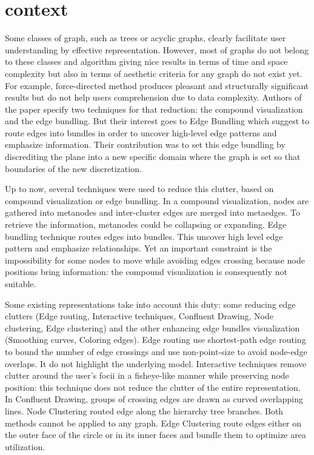 \section*{context}

Some classes of graph, such as trees or acyclic graphs, clearly facilitate user understanding by effective representation. However, most of graphs do not belong to these classes and algorithm giving nice results in terms of time and space complexity but also in terms of aesthetic criteria for any graph do not exist yet. For example, force-directed method produces pleasant and structurally significant results but do not help users comprehension due to data complexity. Authors of the paper specify two techniques for that reduction: the compound visualization and the edge bundling. But their interest goes to Edge Bundling which suggest to route edges into bundles in order to uncover high-level edge patterns and emphasize information. Their contribution was to set this edge bundling by discrediting the plane into a new specific domain where the graph is set so that boundaries of the new discretization.


Up to now, several techniques were used to reduce this clutter, based on compound visualization or edge bundling. In a compound visualization, nodes are gathered into metanodes and inter-cluster edges are merged into metaedges. To retrieve the information, metanodes could be collapsing or expanding. Edge bundling technique routes edges into bundles. This uncover high level edge pattern and emphasize relationships.
Yet an important constraint is the impossibility for some nodes to move while avoiding edges crossing because node positions bring information: the compound visualization is consequently not suitable.


Some existing representations take into account this duty: some reducing edge clutters (Edge routing, Interactive techniques, Confluent Drawing, Node clustering, Edge clustering) and the other enhancing edge bundles visualization (Smoothing curves, Coloring edges). Edge routing use shortest-path edge routing to bound the number of edge crossings and use non-point-size to avoid node-edge overlaps. It do not highlight the underlying model. Interactive techniques remove clutter around the user’s focii in a fisheye-like manner while preserving node position: this technique does not reduce the clutter of the entire representation. In Confluent Drawing, groups of crossing edges are drawn as curved overlapping lines. Node Clustering routed edge along the hierarchy tree branches. Both methods cannot be applied to any graph.
Edge Clustering route edges either on the outer face of the circle or in its inner faces and bundle them to optimize area utilization.


